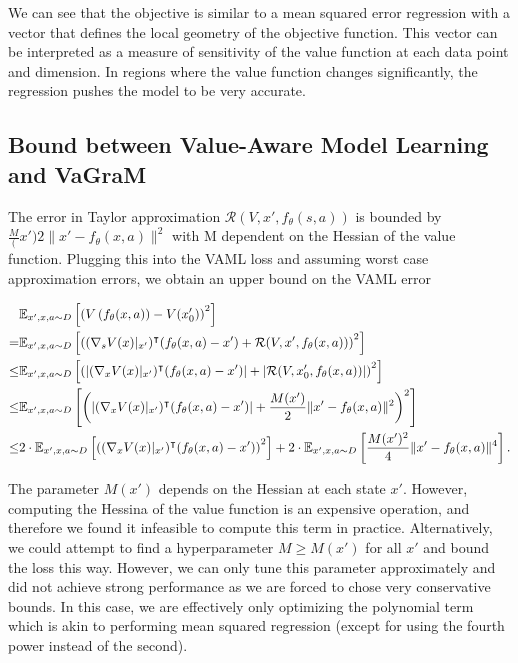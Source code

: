 We can see that the objective is similar to a mean squared error regression with a vector that defines the local geometry of the objective function. This vector can be interpreted as a measure of sensitivity of the value function at each data point and dimension. In regions where the value function changes significantly, the regression pushes the model to be very accurate. 

\subsection{Bound between Value-Aware Model Learning and VaGraM}
\label{app:taylor_bound}

The error in Taylor approximation $\mathcal{R}(V, x', f_\theta(s,a))$ is bounded by $\frac{M}(x'){2}\|x' - f_\theta(x,a)\|^2$ with M dependent on the Hessian of the value function. 
Plugging this into the VAML loss and assuming worst case approximation errors, we obtain an upper bound on the VAML error

\begin{align}
    &\mathbb{E}_{x',x,a \sim D}\left[\left(V\left(f_\theta(x,a) \right) - V(x_0')\right)^2\right] \\
    = &\mathbb{E}_{x',x,a \sim D}\left[\left((\nabla_s V(x)|_{x'})^\intercal (f_\theta(x,a) - x') + \mathcal{R}(V, x',f_\theta(x,a))\right)^2\right]\\
    \leq &\mathbb{E}_{x',x,a \sim D}\left[\left(\left|(\nabla_x V(x)|_{x'})^\intercal (f_\theta(x,a) - x')\right| + \left|\mathcal{R}(V, x_0', f_\theta(x,a))\right|\right)^2\right]\\
    \leq &\mathbb{E}_{x',x,a \sim D}\left[{\left(\left|(\nabla_x V(x)|_{x'})^\intercal (f_\theta(x,a) - x')\right| + \frac{M(x')}{2}\|x' - f_\theta(x,a)\|^2\right)^2}\right]\\
    \leq &2\cdot\mathbb{E}_{x',x,a \sim D}\left[{\left((\nabla_x V(x)|_{x'})^\intercal (f_\theta(x,a) - x')\right)^2}\right] + 2\cdot\mathbb{E}_{x',x,a \sim D}\left[\frac{M(x')^2}{4}\|x' - f_\theta(x,a)\|^4\right].
\end{align}

The parameter $M(x')$ depends on the Hessian at each state $x'$.
However, computing the Hessina of the value function is an expensive operation, and therefore we found it infeasible to compute this term in practice.
Alternatively, we could attempt to find a hyperparameter $M \geq M(x')$ for all $x'$ and bound the loss this way.
However, we can only tune this parameter approximately and did not achieve strong performance as we are forced to chose very conservative bounds.
In this case, we are effectively only optimizing the polynomial term which is akin to performing mean squared regression (except for using the fourth power instead of the second).

